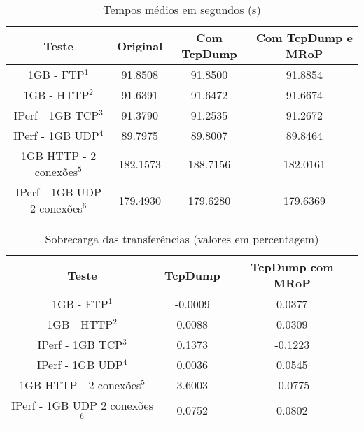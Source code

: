 \begin{table}[!htb]
\begin{center}
\caption{Tempos médios em segundos (s)}
\begin{tabular}{ | c | c | c | c |  }
\hline
Teste & \hspace {0.3cm} Original \hspace {0.3cm}& \hspace {0.2cm} Com TcpDump \hspace {0.2cm} & Com TcpDump e MRoP \\
\hline
1GB - FTP$^{1}$ & 91.8508	& 91.8500 & 91.8854 \\
1GB - HTTP$^{2}$ & 91.6391 & 91.6472 & 91.6674 \\ 
IPerf - 1GB TCP$^{3}$ & 91.3790	& 91.2535	& 91.2672 \\
IPerf - 1GB UDP$^{4}$ & 89.7975 & 89.8007 & 89.8464 \\
\hline
\hline
1GB HTTP - 2 conexões$^{5}$ & 182.1573 & 188.7156 & 182.0161 \\
IPerf - 1GB UDP 2 conexões$^{6}$ & 179.4930 & 179.6280 & 179.6369 \\
\hline
\end{tabular}
\label{tab:desempenho}
\end{center}
\end{table}

\begin{table}[!htb]
\begin{center}
\caption{Sobrecarga das transferências (valores em percentagem)}
\begin{tabular}{ | c | c | c |}
\hline
Teste & \hspace {0.3cm} TcpDump \hspace {0.3cm} & TcpDump com MRoP  \\

\hline
1GB - FTP$^{1}$ & -0.0009  & 0.0377  \\
1GB - HTTP$^{2}$ & 0.0088 &  0.0309   \\
IPerf - 1GB TCP$^{3}$ & 0.1373 &  -0.1223   \\
IPerf - 1GB UDP$^{4}$ & 0.0036 & 0.0545 \\
\hline
\hline
1GB HTTP - 2 conexões$^{5}$ & 3.6003 & -0.0775   \\
IPerf - 1GB UDP 2 conexões$^{6}$ & 0.0752 & 0.0802   \\
\hline
\end{tabular}
\label{tab:overhead}
\end{center}
\end{table}

